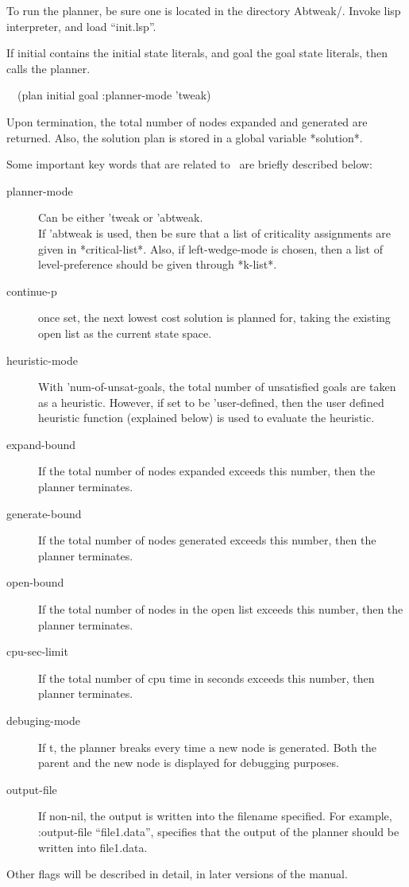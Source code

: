 To run the planner, be sure one is located in the directory Abtweak/.
Invoke lisp interpreter, and load ``init.lsp''.

If initial contains the initial state literals, and goal the goal
state literals, then calls the planner.
\begin{tabbing}
~~(plan initial goal :planner-mode 'tweak)
\end{tabbing}

Upon termination, the total number of nodes expanded and generated are
returned. Also, the solution plan is stored in a global variable *solution*.

Some important key words that are related to \tweak\ are briefly
described below:
\begin{description}
\item[planner-mode]  Can be either 'tweak or 'abtweak.\ \\
If 'abtweak is used, then be sure that a list of criticality
assignments are given in *critical-list*.  Also, if left-wedge-mode is
chosen, then a list of level-preference should be given through *k-list*.

\item[continue-p] once set, the next lowest cost solution is planned
for, taking the existing open list as the current state space.

\item[heuristic-mode] With 'num-of-unsat-goals, the total number of
unsatisfied goals are taken as a heuristic.  However, if set to be
'user-defined, then the user defined heuristic function (explained
below) is used to evaluate the heuristic.

\item[expand-bound] If the total number of nodes expanded exceeds this
number, then the planner terminates.

\item[generate-bound] If the total number of nodes generated exceeds this
number, then the planner terminates.

\item[open-bound] If the total number of nodes in the open list exceeds this
number, then the planner terminates.

\item[cpu-sec-limit] If the total number of cpu time in seconds
exceeds this number, then planner terminates.

\item[debuging-mode] If t, the planner breaks every time a new node is
generated.  Both the parent and the new node is displayed for
debugging purposes.

\item[output-file]  If non-nil, the output is written into the
filename specified.  For example, :output-file ``file1.data'',
specifies that the output of the planner should be written into file1.data.
\item[Other flags will be described in detail, in later versions of
the manual.]
\end{description}

